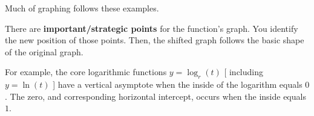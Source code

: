\documentclass{ximera}
\begin{document}
\begin{example}
\begin{image}
\end{image}








\end{example}


Much of graphing follows these examples.  


There are \textbf{important/strategic points} for the function's graph. You identify the new position of those points.  Then, the shifted graph follows the basic shape of the original graph.






For example, the core logarithmic functions $y = \log_r(t)$ [ including $y = \ln(t)$ ] have a vertical asymptote when the inside of the logarithm equals $0$. The zero, and corresponding horizontal intercept, occurs when the inside equals $1$.   
\end{document}
